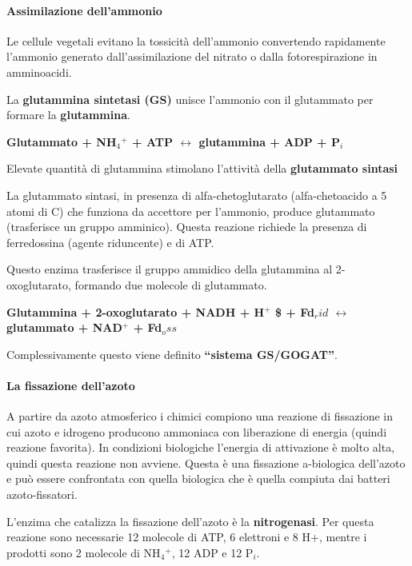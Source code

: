 \documentclass[]{article}
\begin{document}
\paragraph{Assimilazione dell'ammonio}\label{assimilazione-dellammonio}

Le cellule vegetali evitano la tossicità dell'ammonio convertendo
rapidamente l'ammonio generato dall'assimilazione del nitrato o dalla
fotorespirazione in amminoacidi.

La \textbf{glutammina sintetasi (GS)} unisce l'ammonio con il glutammato
per formare la \textbf{glutammina}.

\textbf{Glutammato + NH$_4$$^+$ + ATP $\longleftrightarrow$ glutammina +
ADP + P$_i$}

Elevate quantità di glutammina stimolano l'attività della
\textbf{glutammato sintasi}

La glutammato sintasi, in presenza di alfa-chetoglutarato
(alfa-chetoacido a 5 atomi di C) che funziona da accettore per
l'ammonio, produce glutammato (trasferisce un gruppo amminico). Questa
reazione richiede la presenza di ferredossina (agente riduncente) e di
ATP.

Questo enzima trasferisce il gruppo ammidico della glutammina al
2-oxoglutarato, formando due molecole di glutammato.

\textbf{Glutammina + 2-oxoglutarato + NADH + H$^+$ \$ + Fd$_rid$
$\longleftrightarrow$ glutammato + NAD$^+$ + Fd$_oss$}

Complessivamente questo viene definito \textbf{``sistema GS/GOGAT''}.

\paragraph{La fissazione dell'azoto}\label{la-fissazione-dellazoto}

A partire da azoto atmosferico i chimici compiono una reazione di
fissazione in cui azoto e idrogeno producono ammoniaca con liberazione
di energia (quindi reazione favorita). In condizioni biologiche
l'energia di attivazione è molto alta, quindi questa reazione non
avviene. Questa è una fissazione a-biologica dell'azoto e può essere
confrontata con quella biologica che è quella compiuta dai batteri
azoto-fissatori.

L'enzima che catalizza la fissazione dell'azoto è la
\textbf{nitrogenasi}. Per questa reazione sono necessarie 12 molecole di
ATP, 6 elettroni e 8 H+, mentre i prodotti sono 2 molecole di
NH$_4$$^+$, 12 ADP e 12 P$_i$.
\end{document}
